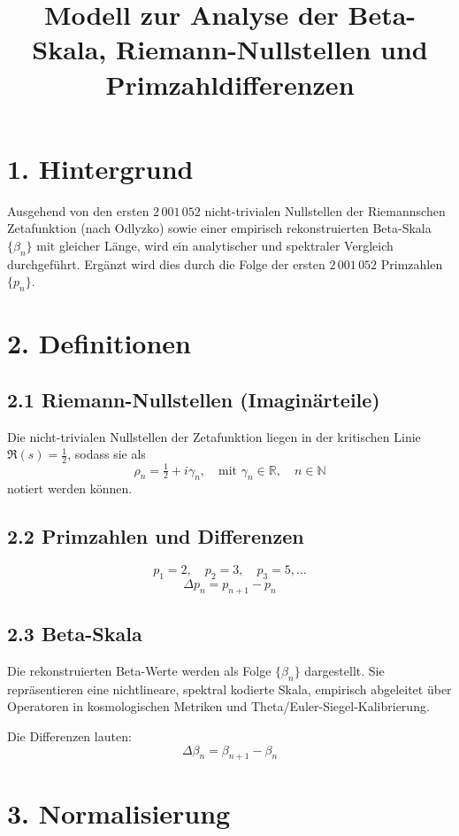 \documentclass{article}
\title{Modell zur Analyse der Beta-Skala, Riemann-Nullstellen und Primzahldifferenzen}
\author{}
\date{}
\begin{document}
\maketitle

\section*{1. Hintergrund}

Ausgehend von den ersten $2\,001\,052$ nicht-trivialen Nullstellen der Riemannschen Zetafunktion (nach Odlyzko) sowie einer empirisch rekonstruierten Beta-Skala $\{\beta_n\}$ mit gleicher Länge, wird ein analytischer und spektraler Vergleich durchgeführt. Ergänzt wird dies durch die Folge der ersten $2\,001\,052$ Primzahlen $\{p_n\}$.

\section*{2. Definitionen}

\subsection*{2.1 Riemann-Nullstellen (Imaginärteile)}

Die nicht-trivialen Nullstellen der Zetafunktion liegen in der kritischen Linie $\Re(s) = \tfrac{1}{2}$, sodass sie als
\[
\rho_n = \tfrac{1}{2} + i \gamma_n, \quad \text{mit } \gamma_n \in \mathbb{R}, \quad n \in \mathbb{N}
\]
notiert werden können.

\subsection*{2.2 Primzahlen und Differenzen}

\[
p_1 = 2,\quad p_2 = 3, \quad p_3 = 5,\ldots
\]
\[
\Delta p_n = p_{n+1} - p_n
\]

\subsection*{2.3 Beta-Skala}

Die rekonstruierten Beta-Werte werden als Folge $\{\beta_n\}$ dargestellt. Sie repräsentieren eine nichtlineare, spektral kodierte Skala, empirisch abgeleitet über Operatoren in kosmologischen Metriken und Theta/Euler-Siegel-Kalibrierung.

Die Differenzen lauten:
\[
\Delta \beta_n = \beta_{n+1} - \beta_n
\]

\section*{3. Normalisierung}
\end{document}
